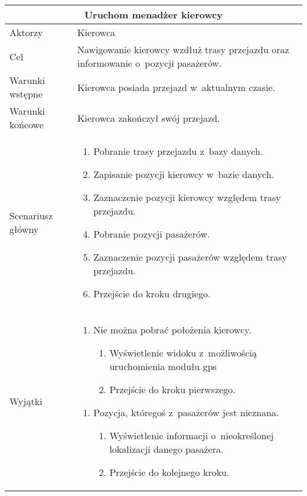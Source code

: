 \documentclass[eng,archivemode]{mgr}
\begin{document}
\begin{tabularx}{1\linewidth}{l|X}
	\multicolumn{2}{c}{\textbf{Uruchom menadżer kierowcy}} \\ \hline
	Aktorzy & Kierowca\\ \hline
	Cel &  Nawigowanie kierowcy wzdłuż trasy przejazdu oraz informowanie o~pozycji pasażerów. \\ \hline
	Warunki wstępne & Kierowca posiada przejazd w~aktualnym czasie. \\ \hline
	Warunki końcowe & Kierowca zakończył swój przejazd.\\ \hline
	Scenariusz główny & 
	\begin{minipage}{4in}
		\vskip 4pt
		\begin{enumerate}
			\item Pobranie trasy przejazdu z~bazy danych.
			\item Zapisanie pozycji kierowcy w~bazie danych.
			\item Zaznaczenie pozycji kierowcy względem trasy przejazdu.
			\item Pobranie pozycji pasażerów.
			\item Zaznaczenie pozycji pasażerów względem trasy przejazdu.
			\item Przejście do kroku drugiego.
		\end{enumerate}
		\vskip 4pt
	\end{minipage}
	\\ \hline
	Wyjątki &
	\begin{minipage}{4in}
		\vskip 4pt
		\begin{enumerate}[label={2.\Alph*.},leftmargin=1.2cm]
			\item Nie można pobrać położenia kierowcy.
			\begin{enumerate}[label=1.A.\arabic*.]
				\item Wyświetlenie widoku z~możliwością uruchomienia modułu gps
				\item Przejście do kroku pierwszego.
			\end{enumerate}					
		\end{enumerate}
		\begin{enumerate}[label={4.\Alph*.},leftmargin=1.2cm]
			\item Pozycja, któregoś z~pasażerów jest nieznana.
			\begin{enumerate}[label=4.A.\arabic*.]
				\item Wyświetlenie informacji o~nieokreślonej lokalizacji danego pasażera.
				\item Przejście do kolejnego kroku.

\end{enumerate}
\end{enumerate}
\end{minipage}
\end{tabularx}
\end{document}
